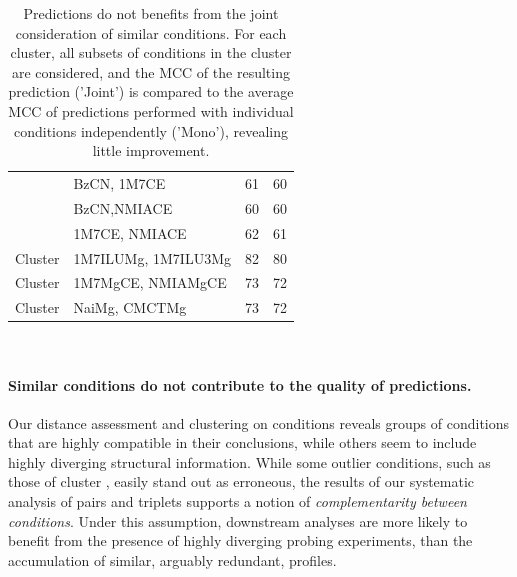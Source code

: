 \documentclass[a4,center,fleqn]{NAR}
\newcommand{\Def}[1]{{\em #1}}
\begin{document}
\begin{table}[h]
{\begin{adjustbox}{max width=\linewidth}
\begin{tabular}{@{}llHH@{}}
				& BzCN, 1M7CE                                & 61                  & 60                      \\
				& BzCN,NMIACE                                & 60                  & 60                      \\
				& 1M7CE, NMIACE                              & 62                  & 61                      \\ \midrule
				{Cluster }                         & 1M7ILUMg, 1M7ILU3Mg                        & 82                  & 80                      \\ \midrule
				{Cluster } & 1M7MgCE, NMIAMgCE                          & 73                  & 72                      \\ \midrule
				{Cluster }                         & NaiMg, CMCTMg                              & 73                  & 72                      \\ \bottomrule
			\end{tabular}
		\end{adjustbox}
		\\}
	\caption{Predictions do not benefits from the joint consideration of similar conditions. For each cluster, all subsets of conditions in the cluster are considered, and the MCC of the resulting prediction ('Joint') is compared to the average MCC of predictions performed with individual conditions independently ('Mono'), revealing little improvement.}\label{fig:similarconds}
\end{table}

\paragraph{Similar conditions do not contribute to the quality of predictions.} 
Our distance assessment and clustering on conditions reveals groups of conditions that are highly compatible in their conclusions, while others seem to include highly diverging structural information. While some outlier conditions, such as those of cluster , easily stand out as erroneous, the results of our systematic analysis of pairs and triplets supports a notion of \Def{complementarity between conditions}. Under this assumption, downstream analyses are more likely to benefit from the presence of highly diverging probing experiments, than the accumulation of similar, arguably redundant, profiles. 
\end{document}
